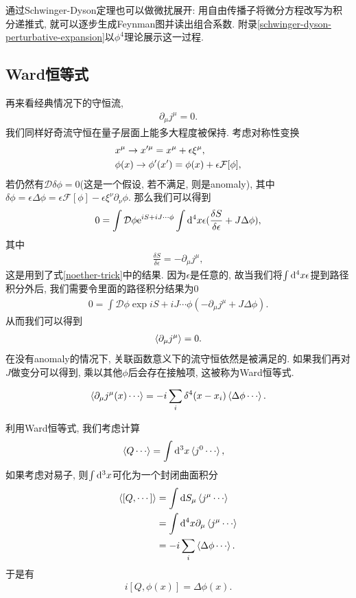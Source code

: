 通过Schwinger-Dyson定理也可以做微扰展开: 用自由传播子将微分方程改写为积分递推式, 就可以逐步生成Feynman图并读出组合系数. 附录\ref{schwinger-dyson-perturbative-expansion}以$\phi^4$理论展示这一过程.

\subsection{Ward恒等式}\label{sec:ward-identity}
再来看经典情况下的守恒流,
\begin{align}
    \partial_\mu j^\mu=0.
\end{align}
我们同样好奇流守恒在量子层面上能多大程度被保持. 考虑对称性变换
\begin{align}
    & x^\mu\to x'^\mu=x^\mu+\epsilon\xi^\mu,\notag\\
    & \phi(x)\to \phi'(x')=\phi(x)+\epsilon\mathcal F[\phi],
\end{align}
若仍然有$\mathcal D\delta\phi=0$(这是一个假设, 若不满足, 则是anomaly), 其中$\delta\phi=\epsilon\Delta\phi=\epsilon\mathcal F[\phi]-\epsilon\xi^\nu\partial_\nu\phi$. 那么我们可以得到
\begin{align}
    0=\int\mathcal D\phi\mathrm e^{iS+iJ\cdots\phi}\int\mathrm d^4x\epsilon(\frac{\delta S}{\delta\epsilon}+J\Delta\phi),
\end{align}
其中
\begin{align}
    \frac{\delta S}{\delta\epsilon}=-\partial_\mu j^\mu,
\end{align}
这是用到了式\eqref{noether-trick}中的结果. 因为$\epsilon$是任意的, 故当我们将$\int\mathrm d^4x\epsilon$提到路径积分外后, 我们需要令里面的路径积分结果为$0$
\begin{align}
    0=\int\mathcal D\phi\exp{iS+iJ\cdots\phi}(-\partial_\mu j^\mu+J\Delta\phi).
\end{align}
从而我们可以得到
\begin{align}
    \braket{\partial_\mu j^\mu}=0.
\end{align}
在没有anomaly的情况下, 关联函数意义下的流守恒依然是被满足的. 如果我们再对$J$做变分可以得到, 乘以其他$\phi$后会存在接触项, 这被称为Ward恒等式.
\begin{theorem}[Ward恒等式]
    \begin{align}
        \braket{\partial_\mu j^\mu(x)\cdots}=-i\sum_i\delta^4(x-x_i)\braket{\Delta\phi\cdots}.
    \end{align}
\end{theorem}

利用Ward恒等式, 我们考虑计算
\begin{align}
    \braket{Q\cdots}&=\int\mathrm d^3x\braket{j^0\cdots},
\end{align}
如果考虑对易子, 则$\int\mathrm d^3x$可化为一个封闭曲面积分
\begin{align}
    \braket{[Q, \cdots]}&=\int\mathrm d S_\mu\braket{j^\mu\cdots}\\
    &=\int\mathrm d^4x \partial_\mu\braket{j^\mu\cdots}\\
    &=-i\sum_i\braket{\Delta\phi\cdots}.
\end{align}
于是有
\begin{align}
    i[Q, \phi(x)]=\Delta\phi(x).
\end{align}

